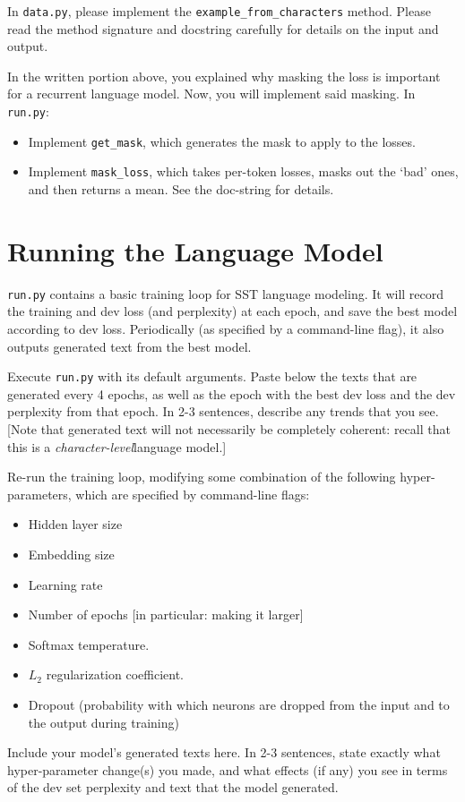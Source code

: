 \documentclass[11pt]{article}
\begin{document}
\noindent In \texttt{data.py}, please implement the \texttt{example\_from\_characters} method.  Please read the method signature and docstring carefully for details on the input and output.


\vspace{2em}
 In the written portion above, you explained why masking the loss is important for a recurrent language model.  Now, you will implement said masking.  In \texttt{run.py}:
\begin{itemize}
  \item Implement \texttt{get\_mask}, which generates the mask to apply to the losses.
  \item Implement \texttt{mask\_loss}, which takes per-token losses, masks out the `bad' ones, and then returns a mean.  See the doc-string for details.
\end{itemize}


\section{Running the Language Model}

\texttt{run.py} contains a basic training loop for SST language modeling. It will record the training and dev loss (and perplexity) at each epoch, and save the best model according to dev loss.  Periodically (as specified by a command-line flag), it also outputs generated text from the best model.

\vspace{2em}
 Execute \texttt{run.py} with its default arguments.  Paste below the texts that are generated every 4 epochs, as well as the epoch with the best dev loss and the dev perplexity from that epoch.  In 2-3 sentences, describe any trends that you see.  [Note that generated text will not necessarily be completely coherent: recall that this is a \emph{character-level}language model.]

\vspace{2em}
 Re-run the training loop, modifying some combination of the following hyper-parameters, which are specified by command-line flags:
\begin{itemize}
  \item Hidden layer size
  \item Embedding size
  \item Learning rate
  \item Number of epochs [in particular: making it larger]
  \item Softmax temperature. 
  \item $L_2$ regularization coefficient.
  \item Dropout (probability with which neurons are dropped from the input and to the output during training)
\end{itemize}
Include your model's generated texts here.  In 2-3 sentences, state exactly what hyper-parameter change(s) you made, and what effects (if any) you see in terms of the dev set perplexity and text that the model generated.
\end{document}
